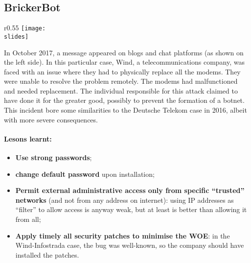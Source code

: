 \subsection{BrickerBot}
\begin{wrapfigure}{r}{0.55\textwidth}
  \centering
  \texttt{[image: \\slides]}
\end{wrapfigure}
In October 2017, a message appeared on blogs and chat platforms (as shown on the left side). In this particular case, Wind, a telecommunications company, was faced with an issue where they had to physically replace all the modems. They were unable to resolve the problem remotely. The modems had malfunctioned and needed replacement. The individual responsible for this attack claimed to have done it for the greater good, possibly to prevent the formation of a botnet. This incident bore some similarities to the Deutsche Telekom case in 2016, albeit with more severe consequences.

\paragraph{Lesons learnt:}
\begin{itemize}
  \item \textbf{Use strong passwords};
  \item \textbf{change default password} upon installation;
  \item \textbf{Permit external administrative access only from specific “trusted” networks} (and not from any address on internet): using IP addresses as “filter” to allow access is anyway weak, but at least is
        better than allowing it from all;
  \item \textbf{Apply timely all security patches to minimise the WOE}: in the Wind-Infostrada case, the bug was
        well-known, so the company should have installed the patches.
\end{itemize}

